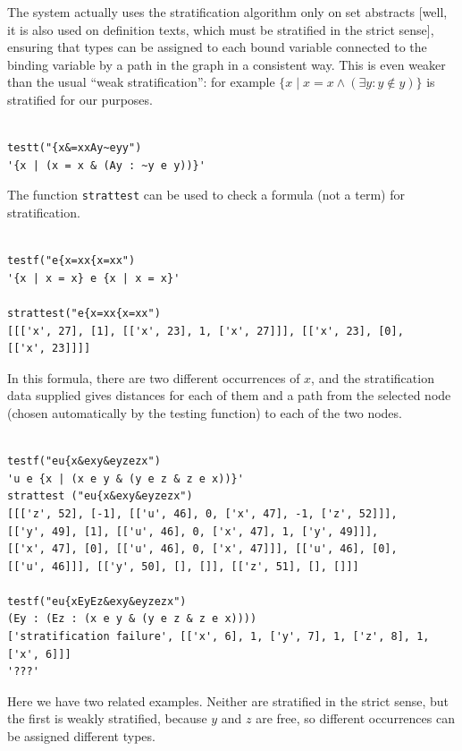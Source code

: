 \documentclass[12pt]{article}
\begin{document}
The system actually uses the stratification algorithm only on
set abstracts [well, it is also used on definition texts, which must be stratified in the strict sense], ensuring that types can be assigned to each bound
variable connected to the binding variable by a path in the
graph in a consistent way. This is even weaker than the usual
``weak stratification'': for example \newline $\{x\mid x=x
\wedge (\exists y:y \not\in y)\}$ is stratified for our
purposes.

\begin{verbatim}

testt("{x&=xxAy~eyy")
'{x | (x = x & (Ay : ~y e y))}'

\end{verbatim}

The function {\tt strattest} can be used to check a formula (not
a term) for stratification.

\begin{verbatim}

testf("e{x=xx{x=xx")
'{x | x = x} e {x | x = x}'

strattest("e{x=xx{x=xx")
[[['x', 27], [1], [['x', 23], 1, ['x', 27]]], [['x', 23], [0],
[['x', 23]]]]

\end{verbatim}

In this formula, there are two different occurrences of $x$, and
the stratification data supplied gives distances for each of
them and a path from the selected node (chosen automatically by
the testing function) to each of the two nodes.

\begin{verbatim}

testf("eu{x&exy&eyzezx")
'u e {x | (x e y & (y e z & z e x))}'
strattest ("eu{x&exy&eyzezx")
[[['z', 52], [-1], [['u', 46], 0, ['x', 47], -1, ['z', 52]]],
[['y', 49], [1], [['u', 46], 0, ['x', 47], 1, ['y', 49]]],
[['x', 47], [0], [['u', 46], 0, ['x', 47]]], [['u', 46], [0],
[['u', 46]]], [['y', 50], [], []], [['z', 51], [], []]]

testf("eu{xEyEz&exy&eyzezx")
(Ey : (Ez : (x e y & (y e z & z e x))))
['stratification failure', [['x', 6], 1, ['y', 7], 1, ['z', 8], 1, ['x', 6]]]
'???'

\end{verbatim}

Here we have two related examples. Neither are stratified in the
strict sense, but the first is weakly stratified, because $y$
and $z$ are free, so different occurrences can be assigned
different types.
\end{document}
